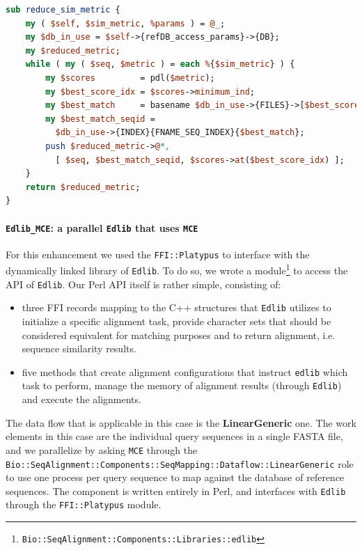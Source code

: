 \documentclass[10pt]{article}
\begin{document}
\noindent\hspace{0.05\linewidth}\begin{minipage}{0.90\textwidth}
\begin{lstlisting}[language=Perl,basicstyle=\footnotesize,frame=none,caption={Parallel reduction of similarity metrics from the command-line \texttt{Edlib} using \texttt{PDL}.},label={lst:ReductionCommandLine},captionpos=b]
sub reduce_sim_metric {
    my ( $self, $sim_metric, %params ) = @_;
    my $db_in_use = $self->{refDB_access_params}->{DB};
    my $reduced_metric;
    while ( my ( $seq, $metric ) = each %{$sim_metric} ) {
        my $scores         = pdl($metric);
        my $best_score_idx = $scores->minimum_ind;
        my $best_match     = basename $db_in_use->{FILES}->[$best_score_idx];
        my $best_match_seqid =
          $db_in_use->{INDEX}{FNAME_SEQ_INDEX}{$best_match};
        push $reduced_metric->@*,
          [ $seq, $best_match_seqid, $scores->at($best_score_idx) ];
    }
    return $reduced_metric;
}
\end{lstlisting}
\end{minipage}

\paragraph{\texttt{Edlib\_MCE}: a parallel \texttt{Edlib} that uses \texttt{MCE}} For this enhancement we used the \texttt{FFI::Platypus} to interface with the dynamically linked library of \texttt{Edlib}. To do so, we wrote a module\footnote{\texttt{Bio::SeqAlignment::Components::Libraries::edlib}} to  access the API of \texttt{Edlib}. Our Perl API itself is rather simple, consisting of:
\begin{itemize}
\item three FFI records mapping to the C++ structures that \texttt{Edlib} utilizes to initialize a specific alignment task, provide character sets that should be considered equivalent for matching purposes and to return alignment, i.e. sequence similarity results.
\item five methods that create alignment configurations that instruct \texttt{edlib} which task to perform, manage the memory of alignment results (through \texttt{Edlib}) and execute the alignments. 
\end{itemize}
The data flow that is applicable in this case is the \textbf{LinearGeneric} one. The work elements in this case are the individual query sequences in a single FASTA file, and we parallelize by asking \texttt{MCE} through the \texttt{Bio::SeqAlignment::Components::SeqMapping::Dataflow::LinearGeneric} role to use one process per query sequence to map against the database of reference sequences.  The component is written entirely in Perl, and interfaces with \texttt{Edlib} through the \texttt{FFI::Platypus} module. 
\end{document}
